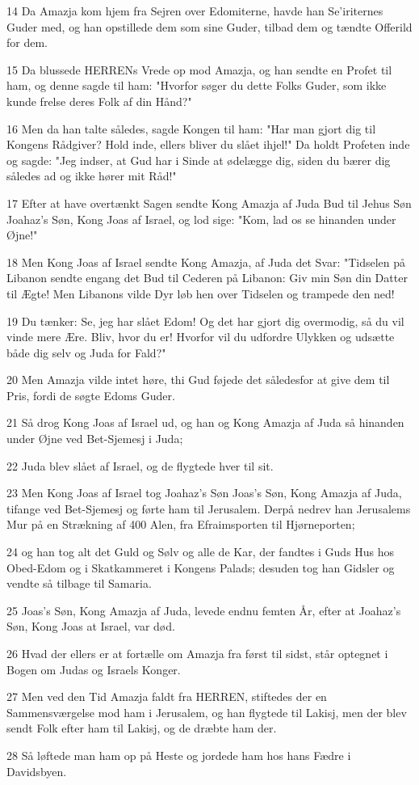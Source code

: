 \par 14 Da Amazja kom hjem fra Sejren over Edomiterne, havde han Se'iriternes Guder med, og han opstillede dem som sine Guder, tilbad dem og tændte Offerild for dem.
\par 15 Da blussede HERRENs Vrede op mod Amazja, og han sendte en Profet til ham, og denne sagde til ham: "Hvorfor søger du dette Folks Guder, som ikke kunde frelse deres Folk af din Hånd?"
\par 16 Men da han talte således, sagde Kongen til ham: "Har man gjort dig til Kongens Rådgiver? Hold inde, ellers bliver du slået ihjel!" Da holdt Profeten inde og sagde: "Jeg indser, at Gud har i Sinde at ødelægge dig, siden du bærer dig således ad og ikke hører mit Råd!"
\par 17 Efter at have overtænkt Sagen sendte Kong Amazja af Juda Bud til Jehus Søn Joahaz's Søn, Kong Joas af Israel, og lod sige: "Kom, lad os se hinanden under Øjne!"
\par 18 Men Kong Joas af Israel sendte Kong Amazja, af Juda det Svar: "Tidselen på Libanon sendte engang det Bud til Cederen på Libanon: Giv min Søn din Datter til Ægte! Men Libanons vilde Dyr løb hen over Tidselen og trampede den ned!
\par 19 Du tænker: Se, jeg har slået Edom! Og det har gjort dig overmodig, så du vil vinde mere Ære. Bliv, hvor du er! Hvorfor vil du udfordre Ulykken og udsætte både dig selv og Juda for Fald?"
\par 20 Men Amazja vilde intet høre, thi Gud føjede det såledesfor at give dem til Pris, fordi de søgte Edoms Guder.
\par 21 Så drog Kong Joas af Israel ud, og han og Kong Amazja af Juda så hinanden under Øjne ved Bet-Sjemesj i Juda;
\par 22 Juda blev slået af Israel, og de flygtede hver til sit.
\par 23 Men Kong Joas af Israel tog Joahaz's Søn Joas's Søn, Kong Amazja af Juda, tifange ved Bet-Sjemesj og førte ham til Jerusalem. Derpå nedrev han Jerusalems Mur på en Strækning af 400 Alen, fra Efraimsporten til Hjørneporten;
\par 24 og han tog alt det Guld og Sølv og alle de Kar, der fandtes i Guds Hus hos Obed-Edom og i Skatkammeret i Kongens Palads; desuden tog han Gidsler og vendte så tilbage til Samaria.
\par 25 Joas's Søn, Kong Amazja af Juda, levede endnu femten År, efter at Joahaz's Søn, Kong Joas at Israel, var død.
\par 26 Hvad der ellers er at fortælle om Amazja fra først til sidst, står optegnet i Bogen om Judas og Israels Konger.
\par 27 Men ved den Tid Amazja faldt fra HERREN, stiftedes der en Sammensværgelse mod ham i Jerusalem, og han flygtede til Lakisj, men der blev sendt Folk efter ham til Lakisj, og de dræbte ham der.
\par 28 Så løftede man ham op på Heste og jordede ham hos hans Fædre i Davidsbyen.

